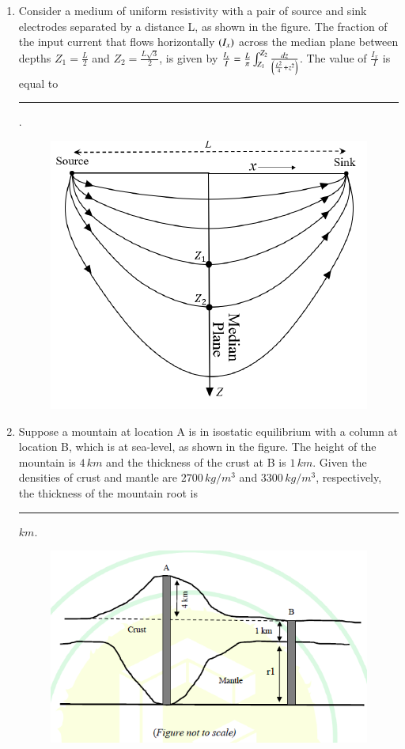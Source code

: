 \documentclass[journal,12pt,onecolumn]{IEEEtran}
\theoremstyle{remark}
\begin{document}
\begin{enumerate}
\item Consider a medium of uniform resistivity with a pair of source and sink electrodes separated by a distance L, as shown in the figure. The fraction of the input current  that flows horizontally $\left(I_x\right)$ across the median plane between depths $Z_1 = \frac{L}{2}$ and $Z_2 = \frac{L\sqrt{3}}{2}$, is given by $\frac{I_x}{I} = \frac{L}{\pi} \int_{Z_1}^{Z_2} \frac{dz}{\left(\frac{L^2}{4} + z^2\right)}$. The value of $\frac{I_x}{I}$ is equal to \rule{3cm}{0.15mm}. 
\begin{figure}[H]
    \centering
    \includegraphics[width=0.6\columnwidth]{figs/fig13.png}
    \caption{}
    \label{fig:q61}
\end{figure}
\hfill{}

\item Suppose a mountain at location A is in isostatic equilibrium with a column at location B, which is at sea-level, as shown in the figure. The height of the mountain is $4\,km$ and the thickness of the crust at B is $1\,km$. Given the densities of crust and mantle are $2700\,kg/m^3$ and $3300 \,kg/m^3$, respectively, the thickness of the mountain root  is \rule{3cm}{0.15mm} $km$. 
\begin{figure}[H]
    \centering
    \includegraphics[width=0.7\columnwidth]{figs/fig14.png}
    \caption{}
    \label{fig:q62}
\end{figure}
\hfill{}


\end{enumerate}
\end{document}
